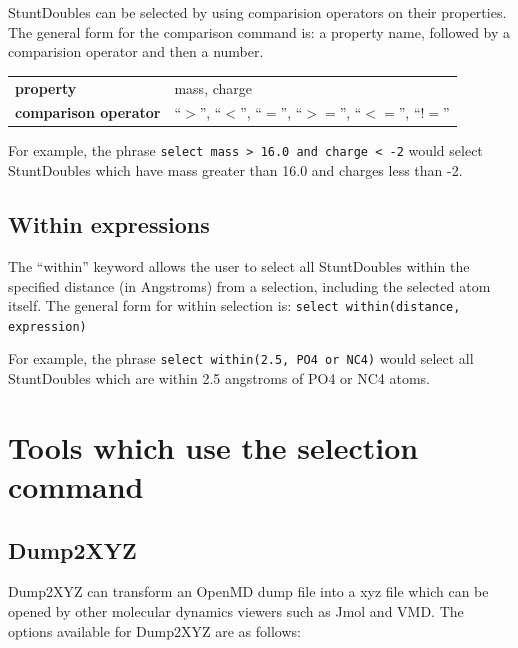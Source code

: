 \documentclass[]{book}
\begin{document}
StuntDoubles can be selected by using comparision operators on their
properties. The general form for the comparison command is: a property
name, followed by a comparision operator and then a number. 

\begin{center}
\begin{tabular}{|l|l|}
\hline
{\bf property} & mass, charge \\
{\bf comparison operator} & ``$>$'', ``$<$'', ``$=$'', ``$>=$'',
``$<=$'', ``$!=$'' \\
\hline
\end{tabular}
\end{center}

For example, the phrase {\tt select mass > 16.0 and charge < -2}
would select StuntDoubles which have mass greater than 16.0 and charges
less than -2.
 
\subsection{\label{section:within}Within expressions}

The ``within'' keyword allows the user to select all StuntDoubles
within the specified distance (in Angstroms) from a selection,
including the selected atom itself. The general form for within
selection is: {\tt select within(distance, expression)}
 
For example, the phrase {\tt select within(2.5, PO4 or NC4)} would
select all StuntDoubles which are within 2.5 angstroms of PO4 or NC4
atoms.

\section{\label{section:tools}Tools which use the selection command}

\subsection{\label{section:Dump2XYZ}Dump2XYZ}

Dump2XYZ can transform an {\sc OpenMD} dump file into a xyz file which can
be opened by other molecular dynamics viewers such as Jmol and
VMD. The options available for Dump2XYZ are as follows:
\end{document}

